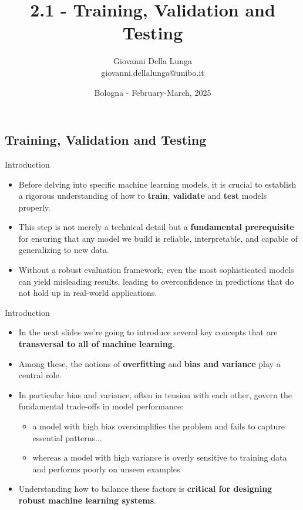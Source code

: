 \documentclass[11pt]{beamer}
\author{Giovanni Della Lunga\\{\footnotesize giovanni.dellalunga@unibo.it}}
\title{2.1 - Training, Validation and Testing}
\subtitle{} %
\institute{Introduction to Machine Learning for Finance}
\date{Bologna - February-March, 2025}
\begin{document}
\begin{frame}
\titlepage
\end{frame}

\AtBeginSubsection{\frame{\subsectionpage}}
%
\subsection[subsection]{Training, Validation and Testing}
%
\begin{frame}{Introduction}
\begin{itemize}
\item Before delving into specific machine learning models, it is crucial to establish a rigorous understanding of how to \textbf{train}, \textbf{validate} and \textbf{test} models properly. 
\item This step is not merely a technical detail but a \textbf{fundamental prerequisite} for ensuring that any model we build is reliable, interpretable, and capable of generalizing to new data. 
\item Without a robust evaluation framework, even the most sophisticated models can yield misleading results, leading to overconfidence in predictions that do not hold up in real-world applications.
\end{itemize}
\end{frame}
%
%
\begin{frame}{Introduction}
\begin{itemize}
\item In the next slides we're going to introduce several key concepts that are \textbf{transversal to all of machine learning}. 
\item Among these, the notions of \textbf{overfitting} and \textbf{bias and variance} play a central role. 
\item In particular bias and variance, often in tension with each other, govern the fundamental trade-offs in model performance: 
\begin{itemize}
	\item a model with high bias oversimplifies the problem and fails to capture essential patterns... 
	\item whereas a model with high variance is overly sensitive to training data and performs poorly on unseen examples
\end{itemize}
\item Understanding how to balance these factors is \textbf{critical for designing robust machine learning systems}.

\end{itemize}
\end{frame}
\end{document}
